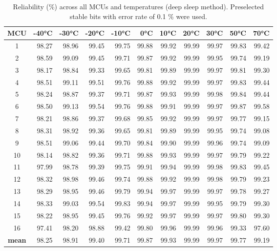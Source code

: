 \begin{table}[ht!]
    \centering
    \begin{tabular}{c||rrrrrrrrrr}
    \toprule
    \textbf{MCU} & \textbf{-40°C} & \textbf{-30°C} & \textbf{-20°C} & \textbf{-10°C} & \textbf{0°C} & \textbf{10°C} & \textbf{20°C} & \textbf{30°C} & \textbf{50°C} & \textbf{70°C} \\
    \midrule
    1    &  98.27 &  98.96 &  99.45 &  99.75 & 99.88 & 99.92 & 99.99 & 99.97 & 99.83 & 99.42 \\
    2    &  98.59 &  99.09 &  99.45 &  99.71 & 99.87 & 99.92 & 99.99 & 99.95 & 99.74 & 99.19 \\
    3    &  98.17 &  98.84 &  99.33 &  99.65 & 99.81 & 99.89 & 99.99 & 99.97 & 99.81 & 99.30 \\
    4    &  98.51 &  99.11 &  99.51 &  99.76 & 99.88 & 99.92 & 99.99 & 99.97 & 99.83 & 99.44 \\
    5    &  98.24 &  98.87 &  99.37 &  99.71 & 99.87 & 99.93 & 99.99 & 99.98 & 99.84 & 99.44 \\
    6    &  98.50 &  99.13 &  99.54 &  99.76 & 99.88 & 99.91 & 99.99 & 99.97 & 99.87 & 99.58 \\
    7    &  98.21 &  98.86 &  99.37 &  99.68 & 99.85 & 99.92 & 99.99 & 99.97 & 99.77 & 99.15 \\
    8    &  98.31 &  98.92 &  99.36 &  99.65 & 99.81 & 99.89 & 99.99 & 99.95 & 99.74 & 99.08 \\
    9    &  98.51 &  99.06 &  99.44 &  99.70 & 99.84 & 99.90 & 99.99 & 99.96 & 99.74 & 99.09 \\
    10   &  98.14 &  98.82 &  99.36 &  99.71 & 99.88 & 99.93 & 99.99 & 99.97 & 99.79 & 99.22 \\
    11   &  97.99 &  98.78 &  99.39 &  99.75 & 99.91 & 99.94 & 99.99 & 99.98 & 99.83 & 99.45 \\
    12   &  98.32 &  98.98 &  99.46 &  99.74 & 99.88 & 99.92 & 99.99 & 99.98 & 99.79 & 99.23 \\
    13   &  98.29 &  98.95 &  99.46 &  99.79 & 99.94 & 99.97 & 99.99 & 99.97 & 99.78 & 99.27 \\
    14   &  98.33 &  99.03 &  99.54 &  99.83 & 99.94 & 99.97 & 99.99 & 99.95 & 99.79 & 99.30 \\
    15   &  98.22 &  98.95 &  99.45 &  99.76 & 99.92 & 99.97 & 99.99 & 99.97 & 99.80 & 99.30 \\
    16   &  97.41 &  98.20 &  98.88 &  99.42 & 99.80 & 99.96 & 99.99 & 99.96 & 99.33 & 97.60 \\
    \textbf{mean} &  98.25 &  98.91 &  99.40 &  99.71 & 99.87 & 99.93 & 99.99 & 99.97 & 99.77 & 99.19 \\
    \bottomrule
    \end{tabular}
    \captionsetup{justification=centering,margin=0.5cm}
    \caption{Reliability (\%) across all MCUs and temperatures (deep sleep method). Preselected stable bits with error rate of 0.1 \% were used.}
    \label{table:reliability_stable_bits}
\end{table}

